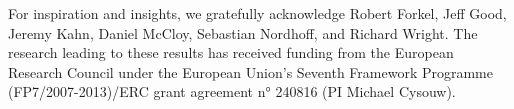 \begin{refsection}

For inspiration and insights, we gratefully acknowledge Robert Forkel, Jeff Good, Jeremy Kahn, Daniel McCloy, Sebastian Nordhoff, and Richard Wright. The research leading to these results has received funding from the European Research Council under the European Union's Seventh Framework Programme (FP7/2007-2013)/ERC grant agreement n° 240816 (PI Michael Cysouw).

\printbibliography[heading=subbibliography]
\end{refsection}

